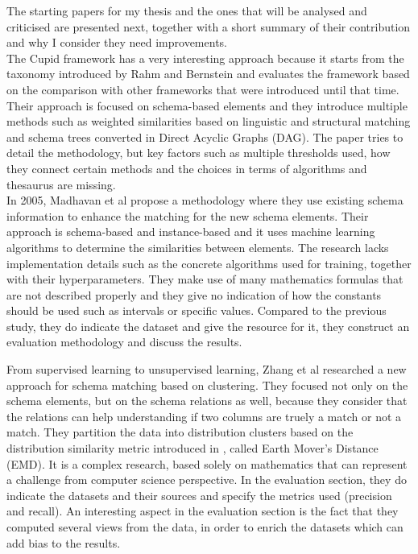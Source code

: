 \documentclass[a4paper]{article}
\begin{document}
The starting papers for my thesis and the ones that will be analysed and criticised are presented next, together with a short summary of their contribution and why I consider they need improvements. \\

The Cupid framework \cite{madhavan2001generic} has a very interesting approach because it starts from the taxonomy introduced by Rahm and Bernstein \cite{rahm2001matching} and evaluates the framework based on the comparison with other frameworks that were introduced until that time. Their approach is focused on schema-based elements and they introduce multiple methods such as weighted similarities based on linguistic and structural matching and schema trees converted in Direct Acyclic Graphs (DAG). The paper tries to detail the methodology, but key factors such as multiple thresholds used, how they connect certain methods and the choices in terms of algorithms and thesaurus are missing. \\

In 2005, Madhavan et al \cite{madhavan2005corpus} propose a methodology where they use existing schema information to enhance the matching for the new schema elements. Their approach is schema-based and instance-based and it uses machine learning algorithms to determine the similarities between elements. The research lacks implementation details such as the concrete algorithms used for training, together with their hyperparameters. They make use of many mathematics formulas that are not described properly and they give no indication of how the constants should be used such as intervals or specific values. Compared to the previous study, they do indicate the dataset and give the resource for it, they construct an evaluation methodology and discuss the results. 

From supervised learning to unsupervised learning, Zhang et al \cite{zhang2011automatic} researched a new approach for schema matching based on clustering. They focused not only on the schema elements, but on the schema relations as well, because they consider that the relations can help understanding if two columns are truely a match or not a match. They partition the data into distribution clusters based on the distribution similarity metric introduced in \cite{zhang2010multi}, called Earth Mover's Distance (EMD). It is a complex research, based solely on mathematics that can represent a challenge from computer science perspective. In the evaluation section, they do indicate the datasets and their sources and specify the metrics used (precision and recall). An interesting aspect in the evaluation section is the fact that they computed several views from the data, in order to enrich the datasets which can add bias to the results. 
\end{document}
